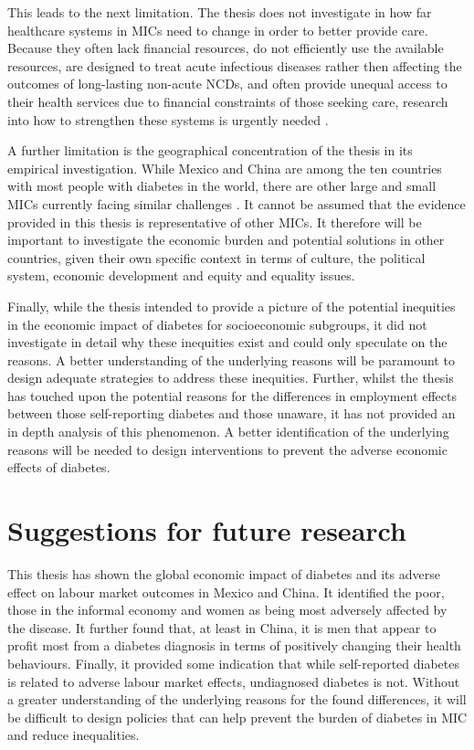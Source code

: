 This leads to the next limitation. The thesis does not investigate in how far healthcare systems in \acp{MIC} need to change in order to better provide care. Because they often lack financial resources, do not efficiently use the available resources, are designed to treat acute infectious diseases rather then affecting the outcomes of long-lasting non-acute \acp{NCD}, and often provide unequal access to their health services due to financial constraints of those seeking care, research into how to strengthen these systems is urgently needed \parencite{Mills2014,Guzman2010}.

A further limitation is the geographical concentration of the thesis in its empirical investigation. While Mexico and China are among the ten countries with most people with diabetes in the world, there are other large and small \acp{MIC} currently facing similar challenges \parencite{Risk2016}.  It cannot be assumed that the evidence provided in this thesis is representative of other \acp{MIC}. It therefore will be important to investigate the economic burden and potential solutions in other countries, given their own specific context in terms of culture, the political system, economic development and equity and equality issues.

Finally, while the thesis intended to provide a picture of the potential inequities in the economic impact of diabetes for socioeconomic subgroups, it did not investigate in detail why these inequities exist and could only speculate on the reasons. A better understanding of the underlying reasons will be paramount to design adequate strategies to address these inequities. Further, whilst the thesis has touched upon the potential reasons for the differences in employment effects between those self-reporting diabetes and those unaware, it has not provided an in depth analysis of this phenomenon. A better identification of the underlying reasons will be needed to design interventions to prevent the adverse economic effects of diabetes. 



\section{Suggestions for future research}

This thesis has shown the global economic impact of diabetes and its adverse effect on labour market outcomes in Mexico and China. It identified the poor, those in the informal economy and women as being most adversely affected by the disease. It further found that, at least in China, it is men that appear to profit most from a diabetes diagnosis in terms of positively changing their health behaviours. Finally, it provided some indication that while self-reported diabetes is related to adverse labour market effects, undiagnosed diabetes is not. Without a greater understanding of the underlying reasons for the found differences, it will be difficult to design policies that can help prevent the burden of diabetes in \ac{MIC} and reduce inequalities.

